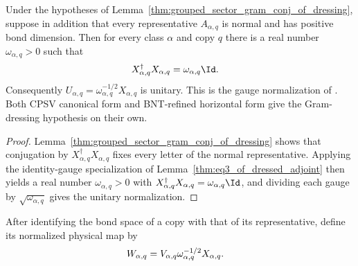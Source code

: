 \begin{lemma}
    \label{thm:grouped_sector_gram_scalar_of_dressing}
    \leanok
    Under the hypotheses of
    Lemma~\ref{thm:grouped_sector_gram_conj_of_dressing}, suppose in
    addition that every representative $A_{\alpha,q}$ is normal and has
    positive bond dimension. Then for every class $\alpha$ and copy $q$
    there is a real number $\omega_{\alpha,q}>0$ such that
    \begin{align}
        X_{\alpha,q}^\dagger X_{\alpha,q}
         & =\omega_{\alpha,q}\Id.
        \label{eq:grouped_sector_gram_scalar_of_dressing}
    \end{align}
    Consequently $U_{\alpha,q}=\omega_{\alpha,q}^{-1/2}X_{\alpha,q}$ is
    unitary. This is the gauge normalization of
    \cite[Proposition~4.13, lines~1903--1921]{Cirac2016MPDO_arXiv}. Both
    CPSV canonical form and BNT-refined horizontal form give
    the Gram-dressing hypothesis on their own.
\end{lemma}

\begin{proof}\leanok
    Lemma~\ref{thm:grouped_sector_gram_conj_of_dressing} shows that
    conjugation by $X_{\alpha,q}^\dagger X_{\alpha,q}$ fixes every letter of
    the normal representative. Applying the identity-gauge specialization of
    Lemma~\ref{thm:eq3_of_dressed_adjoint} then yields a real number
    $\omega_{\alpha,q}>0$ with
    $X_{\alpha,q}^\dagger X_{\alpha,q}=\omega_{\alpha,q}\Id$, and dividing
    each gauge by $\sqrt{\omega_{\alpha,q}}$ gives the unitary normalization.
\end{proof}

\begin{definition}
    \label{def:normalized_grouped_sector_map}
    \leanok
    After identifying the bond space of a copy with that of its representative,
    define its normalized physical map by
    \begin{align}
        W_{\alpha,q}
         & =V_{\alpha,q}\omega_{\alpha,q}^{-1/2}X_{\alpha,q}.
        \notag
    \end{align}
\end{definition}

